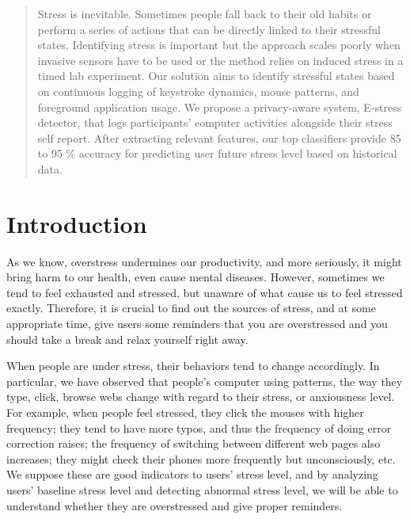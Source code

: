 \documentclass{article}
\begin{document}
 


\begin{abstract} 
Stress is inevitable. Sometimes people fall back to their old habits or perform a series of actions that can be directly linked to their stressful states. Identifying stress is important but the approach scales poorly when invasive sensors have to be used or the method relies on induced stress in a timed lab experiment.  Our solution aims to identify stressful states based on continuous logging of keystroke dynamics, mouse patterns, and foreground application usage. We propose a privacy-aware system, E-stress detector, that logs participants' computer activities alongside their stress self report. After extracting relevant features, our top classifiers provide 85 to 95 \% accuracy for predicting user future stress level based on historical data. 
\end{abstract} 

\section{Introduction}
\label{introduction}

As we know, overstress undermines our productivity, and more seriously, it might bring harm to our health, even cause mental diseases. However, sometimes we tend to feel exhausted and stressed, but unaware of what cause us to feel stressed exactly. Therefore, it is crucial to find out the sources of stress, and at some appropriate time, give  users some reminders that you are overstressed and you should take a break and relax yourself right away.

When people are under stress, their behaviors tend to change accordingly. In particular, we have observed that people’s computer using patterns, the way they type, click, browse webs change with regard to their stress, or anxiousness level. For example, when people feel stressed, they click the mouses with higher frequency; they tend to have more typos, and thus the frequency of doing error correction raises; the frequency of switching between different web pages also increases; they might check their phones more frequently but unconsciously, etc. We suppose these are good indicators to users’ stress level, and by analyzing users’ baseline stress level and detecting abnormal stress level, we will be able to understand whether they are overstressed and give proper reminders.
\end{document}
